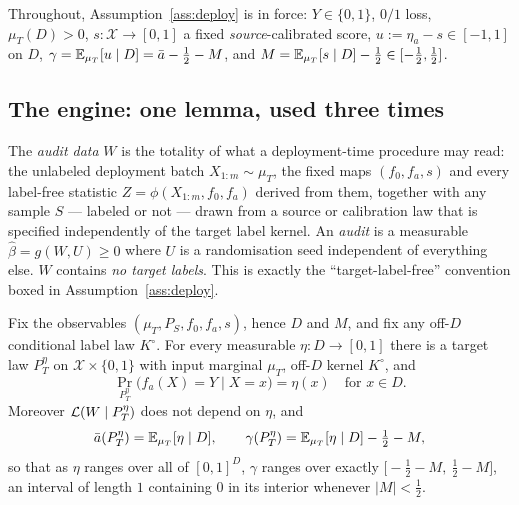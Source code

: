 Throughout, Assumption~\ref{ass:deploy} is in force: $Y\in\{0,1\}$, $0/1$ loss, $\mu_T(D)>0$,
$s:\mathcal X\to[0,1]$ a fixed \emph{source}-calibrated score, $u:=\eta_a-s\in[-1,1]$ on $D$,
$\gamma=\mathbb{E}_{\mu_T}[u\mid D]=\bar a-\tfrac12-M$, and $M=\mathbb{E}_{\mu_T}[s\mid D]-\tfrac12\in[-\tfrac12,\tfrac12]$.

\subsection{The engine: one lemma, used three times}

\begin{definition}\label{def:audit-data}
The \emph{audit data} $W$ is the totality of what a deployment-time procedure may read:
the unlabeled deployment batch $X_{1:m}\sim\mu_T$, the fixed maps $(f_0,f_a,s)$ and every
label-free statistic $Z=\phi(X_{1:m},f_0,f_a)$ derived from them, together with any sample
$S$ --- labeled or not --- drawn from a source or calibration law that is specified
independently of the target label kernel. An \emph{audit} is a measurable
$\widehat\beta=g(W,U)\ge0$ where $U$ is a randomisation seed independent of everything else.
$W$ contains \emph{no target labels}. This is exactly the ``target-label-free'' convention
boxed in Assumption~\ref{ass:deploy}.
\end{definition}

\begin{lemma}\label{lem:fibre}
Fix the observables $(\mu_T,P_S,f_0,f_a,s)$, hence $D$ and $M$, and fix any off-$D$
conditional label law $K^\circ$. For every measurable $\eta:D\to[0,1]$ there is a target law
$P_T^{\eta}$ on $\mathcal X\times\{0,1\}$ with input marginal $\mu_T$, off-$D$ kernel
$K^\circ$, and
\[
\Pr_{P_T^{\eta}}\bigl(f_a(X)=Y\mid X=x\bigr)=\eta(x)\quad\text{for }x\in D .
\]
Moreover $\mathcal{L}(W\mid P_T^{\eta})$ does not depend on $\eta$, and
\[
\bar a(P_T^\eta)=\mathbb{E}_{\mu_T}[\eta\mid D],\qquad
\gamma(P_T^\eta)=\mathbb{E}_{\mu_T}[\eta\mid D]-\tfrac12-M ,
\]
so that as $\eta$ ranges over all of $[0,1]^D$, $\gamma$ ranges over exactly
$\bigl[-\tfrac12-M,\ \tfrac12-M\bigr]$, an interval of length $1$ containing $0$ in its
interior whenever $|M|<\tfrac12$.
\end{lemma}

